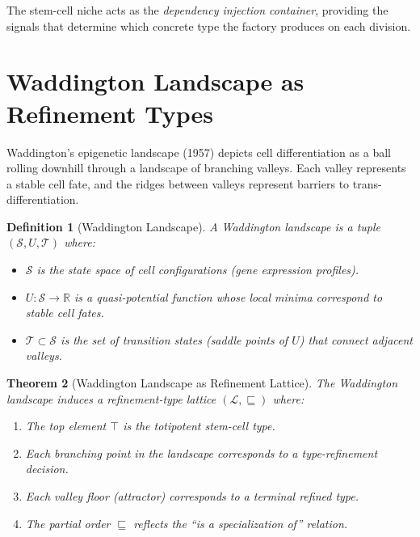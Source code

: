 \documentclass[12pt,a4paper]{article}
\newtheorem{theorem}{Theorem}[section]
\newtheorem{definition}[theorem]{Definition}
\begin{document}
The stem-cell niche acts as the \emph{dependency injection container},
providing the signals that determine which concrete type the factory
produces on each division.


\section{Waddington Landscape as Refinement Types}\label{sec:waddington}

Waddington's epigenetic landscape (1957) depicts cell differentiation
as a ball rolling downhill through a landscape of branching valleys.
Each valley represents a stable cell fate, and the ridges between
valleys represent barriers to trans-differentiation.

\begin{definition}[Waddington Landscape]\label{def:waddington}
A \emph{Waddington landscape} is a tuple $(\mathcal{S}, U, \mathcal{T})$ where:
\begin{itemize}
  \item $\mathcal{S}$ is the state space of cell configurations
    (gene expression profiles).
  \item $U : \mathcal{S} \to \mathbb{R}$ is a quasi-potential function
    whose local minima correspond to stable cell fates.
  \item $\mathcal{T} \subset \mathcal{S}$ is the set of
    \emph{transition states} (saddle points of $U$) that connect
    adjacent valleys.
\end{itemize}
\end{definition}

\begin{theorem}[Waddington Landscape as Refinement Lattice]\label{thm:waddington-lattice}
The Waddington landscape induces a refinement-type lattice
$(\mathcal{L}, \sqsubseteq)$ where:
\begin{enumerate}
  \item The top element $\top$ is the totipotent stem-cell type.
  \item Each branching point in the landscape corresponds to a
    type-refinement decision.
  \item Each valley floor (attractor) corresponds to a terminal
    refined type.
  \item The partial order $\sqsubseteq$ reflects the ``is a
    specialization of'' relation.
\end{enumerate}
\end{theorem}
\end{document}
